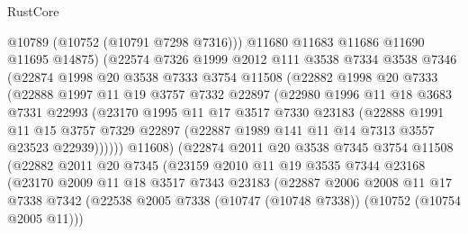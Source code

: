 \begin{lexlean}{RustCore}
\begin{coremodule}
                  @10789
                  (@10752 (@10791 @7298 @7316)))
                @11680
                @11683
                @11686
                @11690
                @11695
                @14875)
              (@22574
                @7326
                @1999
                @2012
                @111
                @3538
                @7334
                @3538
                @7346
                (@22874
                  @1998
                  @20
                  @3538
                  @7333
                  @3754
                  @11508
                  (@22882
                    @1998
                    @20
                    @7333
                    (@22888
                      @1997
                      @11
                      @19
                      @3757
                      @7332
                      @22897
                      (@22980
                        @1996
                        @11
                        @18
                        @3683
                        @7331
                        @22993
                        (@23170
                          @1995
                          @11
                          @17
                          @3517
                          @7330
                          @23183
                          (@22888
                            @1991
                            @11
                            @15
                            @3757
                            @7329
                            @22897
                            (@22887 @1989 @141 @11 @14 @7313 @3557 @23523 @22939))))))
                  @11608)
                (@22874
                  @2011
                  @20
                  @3538
                  @7345
                  @3754
                  @11508
                  (@22882
                    @2011
                    @20
                    @7345
                    (@23159
                      @2010
                      @11
                      @19
                      @3535
                      @7344
                      @23168
                      (@23170
                        @2009
                        @11
                        @18
                        @3517
                        @7343
                        @23183
                        (@22887
                          @2006
                          @2008
                          @11
                          @17
                          @7338
                          @7342
                          (@22538 @2005 @7338 (@10747 (@10748 @7338)) (@10752 (@10754 @2005 @11)))

\end{coremodule}
\end{lexlean}
